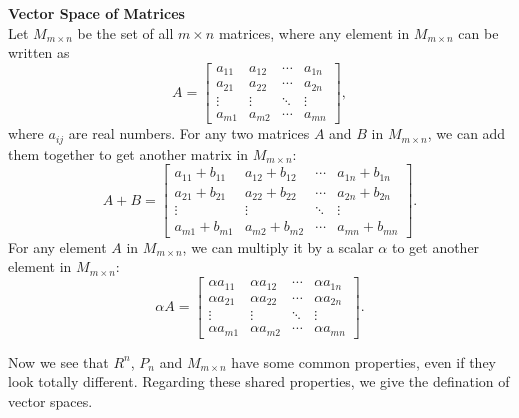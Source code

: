 \documentclass[10pt, a4paper]{article}
\begin{document}
\begin{example}
    \textbf{Vector Space of Matrices}\\
    Let $M_{m\times n}$ be the set of all $m\times n$ matrices, where any element in $M_{m\times n}$ can be written as
    \begin{equation}
        A = \begin{bmatrix}
            a_{11} & a_{12} & \cdots & a_{1n} \\
            a_{21} & a_{22} & \cdots & a_{2n} \\
            \vdots & \vdots & \ddots & \vdots \\
            a_{m1} & a_{m2} & \cdots & a_{mn}
        \end{bmatrix},
    \end{equation}
    where $a_{ij}$ are real numbers. For any two matrices $A$ and $B$ in $M_{m\times n}$, we can add them together to get another matrix in $M_{m\times n}$:
    \begin{equation}
        A + B = \begin{bmatrix}
            a_{11} + b_{11} & a_{12} + b_{12} & \cdots & a_{1n} + b_{1n} \\
            a_{21} + b_{21} & a_{22} + b_{22} & \cdots & a_{2n} + b_{2n} \\
            \vdots & \vdots & \ddots & \vdots \\
            a_{m1} + b_{m1} & a_{m2} + b_{m2} & \cdots & a_{mn} + b_{mn}
        \end{bmatrix}.
    \end{equation}
    For any element $A$ in $M_{m\times n}$, we can multiply it by a scalar $\alpha$ to get another element in $M_{m\times n}$:
    \begin{equation}
        \alpha A = \begin{bmatrix}
            \alpha a_{11} & \alpha a_{12} & \cdots & \alpha a_{1n} \\
            \alpha a_{21} & \alpha a_{22} & \cdots & \alpha a_{2n} \\
            \vdots & \vdots & \ddots & \vdots \\
            \alpha a_{m1} & \alpha a_{m2} & \cdots & \alpha a_{mn}
        \end{bmatrix}.
    \end{equation}
\end{example}

Now we see that $R^n$, $P_n$ and $M_{m\times n}$ have some common properties, even if they look totally different. Regarding these shared properties, we give the defination of vector spaces.
\end{document}
